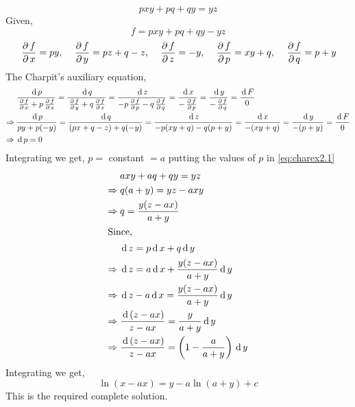 \documentclass[../main-sheet.tex]{subfiles}
\begin{document}
\begin{soln}
    \begin{equation}
        pxy+pq+qy=yz \label{eq:charex2.1}
    \end{equation}
    Given,
    \[
        f=pxy+pq+qy-yz
    \]
    \[
        \,\frac{\partial\, f}{\partial\, x}=py,\quad\,\frac{\partial\, f}{\partial\, y}=pz+q-z,\quad\,\frac{\partial\, f}{\partial\, z}=-y,\quad\,\frac{\partial\, f}{\partial\, p}=xy+q,\quad\,\frac{\partial\, f}{\partial\, q}=p+y
    \]
    The Charpit's auxiliary equation,
    \begin{align*}
        &\frac{\,\mathrm{d}\, p}{\,\frac{\partial\, f}{\partial\, x}+p\,\frac{\partial\, f}{\partial\, z}}=\frac{\,\mathrm{d}\, q}{\,\frac{\partial\, f}{\partial\, y}+q\,\frac{\partial\, f}{\partial\, z}}=\frac{\,\mathrm{d}\, z}{-p\,\frac{\partial\, f}{\partial\, p}-q\,\frac{\partial\, f}{\partial\, q}}=\frac{\,\mathrm{d}\, x}{-\,\frac{\partial\, f}{\partial\, p}}=\frac{\,\mathrm{d}\, y}{-\,\frac{\partial\, f}{\partial\, q}}=\frac{\,\mathrm{d}\, F}{0}\\
        \Rightarrow\;&\frac{\,\mathrm{d}\, p}{py+p(-y)}=\frac{\,\mathrm{d}\, q}{(px+q-z)+q(-y)}=\frac{\,\mathrm{d}\, z}{-p(xy+q)-q(p+y)}=\frac{\,\mathrm{d}\, x}{-(xy+q)}=\frac{\,\mathrm{d}\, y}{-(p+y)}=\frac{\,\mathrm{d}\, F}{0}\\
        \Rightarrow\;&\,\mathrm{d}\, p=0
    \end{align*}
    Integrating we get, \(p=\) constant \(=a\)
    putting the values of \(p\) in \eqref{eq:charex2.1}
    \begin{align*}
        &axy+aq+qy=yz\\
        \Rightarrow\;&q(a+y)=yz-axy\\
        \Rightarrow\;&q=\frac{y(z-ax)}{a+y}\\
        \intertext{Since,}
        &\,\mathrm{d}\, z=p\,\mathrm{d}\, x+q\,\mathrm{d}\, y\\
        \Rightarrow\;&\,\mathrm{d}\, z=a\,\mathrm{d}\, x+\frac{y(z-ax)}{a+y}\,\mathrm{d}\, y\\
        \Rightarrow\;&\,\mathrm{d}\, z-a\,\mathrm{d}\, x=\frac{y(z-ax)}{a+y}\,\mathrm{d}\, y\\
        \Rightarrow\;&\frac{\,\mathrm{d}\, (z-ax)}{z-ax}=\frac{y}{a+y}\,\mathrm{d}\, y\\
        \Rightarrow\;&\frac{\,\mathrm{d}\, (z-ax)}{z-ax}=\left(1-\frac{a}{a+y}\right)\,\mathrm{d}\, y
    \end{align*}
    Integrating we get,
    \[\ln (x-ax)=y-a\ln(a+y)+c\]
    This is the required complete solution.
\end{soln}
\end{document}

